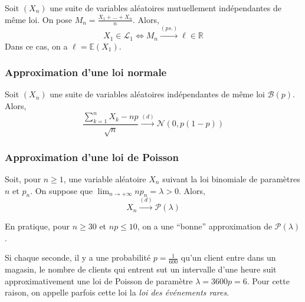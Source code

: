 
  \begin{theorem}
    Soit $(X_n)$ une suite de variables aléatoires mutuellement indépendantes de même loi. On pose $M_n = \frac{X_1 + \dots + X_n}{n}$. Alors,
    \[ X_1 \in \mathcal{L}_1 \iff M_n \overset{(ps.)}{\longrightarrow} \ell \in \mathbb{R} \]
    Dans ce cas, on a $\ell = \mathbb{E}(X_1)$.
  \end{theorem}

  \subsubsection{Approximation d'une loi normale}


  \begin{theorem}
    Soit $(X_n)$ une suite de variables aléatoires indépendantes de même loi $\mathcal{B}(p)$. Alors,
    \[ \frac{\sum_{k=1}^{n} X_k - np}{\sqrt{n}} \overset{(d)}{\longrightarrow} \mathcal{N}(0, p(1-p)) \]
  \end{theorem}

  \subsubsection{Approximation d'une loi de Poisson}


  \begin{theorem}
    Soit, pour $n \geq 1$, une variable aléatoire $X_n$ suivant la loi binomiale de paramètres $n$ et $p_n$. On suppose que $\lim_{n \rightarrow +\infty} n p_n = \lambda > 0$.
    Alors,
    \[ X_n \overset{(d)}{\longrightarrow} \mathcal{P}(\lambda) \]
  \end{theorem}

  \begin{remark}
    En pratique, pour $n \geq 30$ et $np \leq 10$, on a une ``bonne'' approximation de $\mathcal{P}(\lambda)$.
  \end{remark}


  \begin{example}
    Si chaque seconde, il y a une probabilité $p = \frac{1}{600}$ qu'un client entre dans un magasin, le nombre de clients qui entrent sut un intervalle d'une heure suit approximativement une loi de Poisson de paramètre $\lambda = 3600p = 6$.
    \newpar
    Pour cette raison, on appelle parfois cette loi la \textit{loi des événements rares}.
  \end{example}

